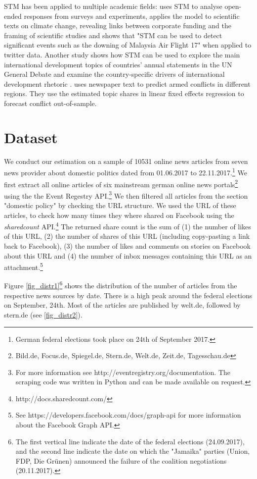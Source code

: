 \documentclass[12pt,a4paper,notitlepage]{article}
\begin{document}
STM has been applied to multiple academic fields: \citet{roberts_structural_2014} uses STM to analyse open-ended responses from surveys and experiments, \citet{farrell_corporate_2016} applies the model to scientific texts on climate change, revealing links between corporate funding and the framing of scientific studies and \citet{mishler_using_2015} shows that "STM can be used to detect significant events such as the downing of Malaysia Air Flight 17" when applied to twitter data. Another study shows how STM can be used to explore the main international development topics of countries’ annual statements in the UN General Debate and examine the country-specific drivers of international development rhetoric \citep{baturo_what_2017}. \citet{mueller_reading_2016} uses newspaper text to predict armed conflicts in different regions. They use the estimated topic shares in linear fixed effects regression to forecast conflict out-of-sample.

\section{Dataset}\label{ch_data}

We conduct our estimation on a sample of 10531 online news articles from seven news provider about domestic politics dated from 01.06.2017 to 22.11.2017.\footnote{German federal elections took place on 24th of September 2017.} We first extract all online articles of six mainstream german online news portals\footnote{Bild.de, Focus.de, Spiegel.de, Stern.de, Welt.de, Zeit.de, Tagesschau.de} using the the Event Regestry API.\footnote{For more information see http://eventregistry.org/documentation. The scraping code was written in Python and can be made available on request.} We then filtered all articles from the section "domestic policy" by checking the URL structure. We used the URL of these articles, to check how many times they where shared on Facebook using the \textit{sharedcount} API.\footnote{http://docs.sharedcount.com/} The returned share count is the sum of (1) the number of likes of this URL, (2) the number of shares of this URL (including copy-pasting a link back to Facebook), (3) the number of likes and comments on stories on Facebook about this URL and (4) the number of inbox messages containing this URL as an attachment.\footnote{See https://developers.facebook.com/docs/graph-api for more information about the Facebook Graph API.}

Figure \ref{fig_distr1}\footnote{The first vertical line indicate the date of the federal elections (24.09.2017), and the second line indicate the date on which the "Jamaika" parties (Union, FDP, Die Grünen) announced the failure of the coalition negotiations (20.11.2017).} shows the distribution of the number of articles from the respective news sources by date. There is a high peak around the federal elections on September, 24th. Most of the articles are published by welt.de, followed by stern.de (see \ref{fig_distr2}).  
\end{document}
